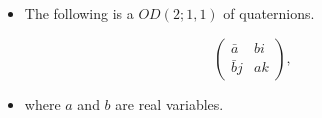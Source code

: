 \documentclass{beamer}
\begin{document}
\begin{frame}
  \begin{itemize}
    \item The following is a $OD(2;1,1)$ of quaternions.
  \end{itemize}

  \[
  \begin{pmatrix}
    \bar{a} & bi \\
    \bar{b}j & ak
  \end{pmatrix},
  \]

  \begin{itemize}
    \item where $a$ and $b$ are real variables.
  \end{itemize}
\end{frame}

\begin{frame}


\end{frame}
\end{document}
